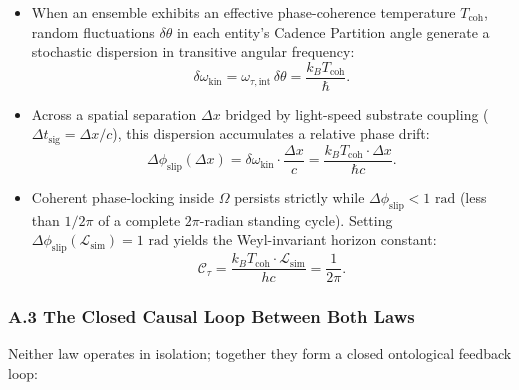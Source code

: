 \documentclass[
]{article}
\providecommand{\tightlist}{%
  \setlength{\itemsep}{0pt}\setlength{\parskip}{0pt}}
\begin{document}
\begin{itemize}
\tightlist
\item
  When an ensemble exhibits an effective phase-coherence temperature
  \(T_{\text{coh}}\), random fluctuations \(\delta\theta\) in each
  entity's Cadence Partition angle generate a stochastic dispersion in
  transitive angular frequency:
  \[\delta\omega_{\text{kin}} = \omega_{\tau,\text{int}}\,\delta\theta = \frac{k_B T_{\text{coh}}}{\hbar}.\]
\item
  Across a spatial separation \(\Delta x\) bridged by light-speed
  substrate coupling (\(\Delta t_{\text{sig}} = \Delta x / c\)), this
  dispersion accumulates a relative phase drift:
  \[\Delta\phi_{\text{slip}}(\Delta x) = \delta\omega_{\text{kin}} \cdot \frac{\Delta x}{c} = \frac{k_B T_{\text{coh}} \cdot \Delta x}{\hbar c}.\]
\item
  Coherent phase-locking inside \(\Omega\) persists strictly while
  \(\Delta\phi_{\text{slip}} < 1\text{ rad}\) (less than \(1/2\pi\) of a
  complete \(2\pi\)-radian standing cycle). Setting
  \(\Delta\phi_{\text{slip}}(\mathcal{L}_{\text{sim}}) = 1\text{ rad}\)
  yields the Weyl-invariant horizon constant:
  \[\mathcal{C}_\tau = \frac{k_B T_{\text{coh}} \cdot \mathcal{L}_{\text{sim}}}{h c} = \frac{1}{2\pi}.\]
\end{itemize}

\subsubsection{A.3 The Closed Causal Loop Between Both
Laws}\label{a.3-the-closed-causal-loop-between-both-laws}

Neither law operates in isolation; together they form a closed
ontological feedback loop:
\end{document}
